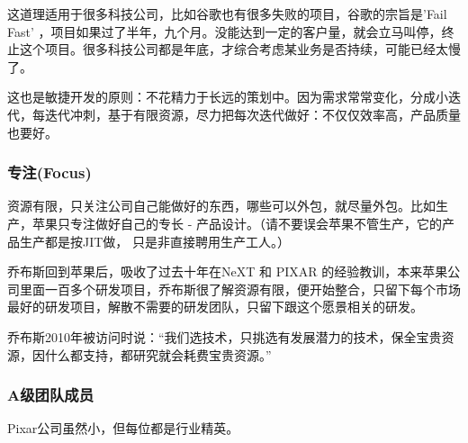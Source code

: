 这道理适用于很多科技公司，比如谷歌也有很多失败的项目，谷歌的宗旨是'Fail
Fast'
，项目如果过了半年，九个月。没能达到一定的客户量，就会立马叫停，终止这个项目。很多科技公司都是年底，才综合考虑某业务是否持续，可能已经太慢了。

这也是敏捷开发的原则：不花精力于长远的策划中。因为需求常常变化，分成小迭代，每迭代冲刺，基于有限资源，尽力把每次迭代做好：不仅仅效率高，产品质量也要好。

\hypertarget{ux4e13ux6ce8focus}{%
\subsubsection{专注(Focus)}\label{ux4e13ux6ce8focus}}

资源有限，只关注公司自己能做好的东西，哪些可以外包，就尽量外包。比如生产，苹果只专注做好自己的专长
- 产品设计。（请不要误会苹果不管生产，它的产品生产都是按JIT做，
只是非直接聘用生产工人。）

乔布斯回到苹果后，吸收了过去十年在NeXT 和 PIXAR
的经验教训，本来苹果公司里面一百多个研发项目，乔布斯很了解资源有限，便开始整合，只留下每个市场最好的研发项目，解散不需要的研发团队，只留下跟这个愿景相关的研发。

乔布斯2010年被访问时说：``我们选技术，只挑选有发展潜力的技术，保全宝贵资源，因什么都支持，都研究就会耗费宝贵资源。''

\hypertarget{aux7ea7ux56e2ux961fux6210ux5458}{%
\subsubsection{A级团队成员}\label{aux7ea7ux56e2ux961fux6210ux5458}}

Pixar公司虽然小，但每位都是行业精英。


